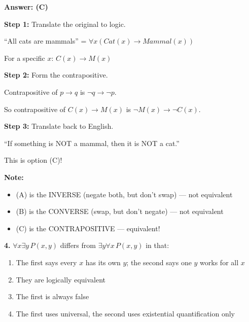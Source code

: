 \documentclass[11pt,a4paper]{article}
\begin{document}
\begin{solnbox}
\textbf{Answer: (C)}

\textbf{Step 1:} Translate the original to logic.

``All cats are mammals'' = $\forall x (Cat(x) \to Mammal(x))$

For a specific $x$: $C(x) \to M(x)$

\textbf{Step 2:} Form the contrapositive.

Contrapositive of $p \to q$ is $\neg q \to \neg p$.

So contrapositive of $C(x) \to M(x)$ is $\neg M(x) \to \neg C(x)$.

\textbf{Step 3:} Translate back to English.

``If something is NOT a mammal, then it is NOT a cat.''

This is option (C)!

\textbf{Note:}
\begin{itemize}[noitemsep]
    \item (A) is the INVERSE (negate both, but don't swap) --- not equivalent
    \item (B) is the CONVERSE (swap, but don't negate) --- not equivalent
    \item (C) is the CONTRAPOSITIVE --- equivalent!
\end{itemize}
\end{solnbox}

\vspace{10pt}

\textbf{4.} $\forall x \exists y\, P(x, y)$ differs from $\exists y \forall x\, P(x, y)$ in that:

\begin{enumerate}[label=(\Alph*),noitemsep]
    \item The first says every $x$ has its own $y$; the second says one $y$ works for all $x$
    \item They are logically equivalent
    \item The first is always false
    \item The first uses universal, the second uses existential quantification only
\end{enumerate}
\end{document}
